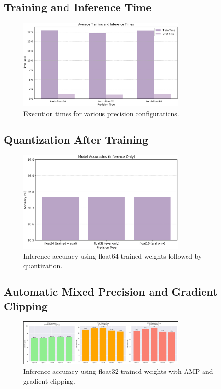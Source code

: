 \documentclass[11pt]{article}
\begin{document}
	\subsection*{Training and Inference Time}

	\begin{figure}[H]
    	\centering
    	\includegraphics[width=0.75\textwidth]{figures/times.png}
    	\caption{Execution times for various precision configurations.}
	\end{figure}

	\subsection*{Quantization After Training}

	\begin{figure}[H]
    	\centering
    	\includegraphics[width=0.75\textwidth]{figures/inferenceOnly.png}
    	\caption{Inference accuracy using float64-trained weights followed by quantization.}
	\end{figure}

	\subsection*{Automatic Mixed Precision and Gradient Clipping}
	\begin{figure}[H]
    	\centering
    	\includegraphics[width=0.75\textwidth]{figures/gradclip_32.png}
    	\caption{Inference accuracy using float32-trained weights with AMP and gradient clipping.}
	\end{figure}
\end{document}
